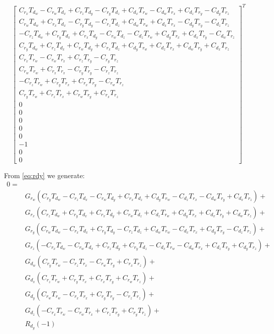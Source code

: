 \documentclass[12pt]{article}
\begin{document}
   \begin{equation}
       \begin{bmatrix}
       C_{r_x} T_{d_w}-C_{r_w} T_{d_x}+C_{r_z} T_{d_y}-C_{r_y} T_{d_z}+C_{d_x} T_{r_w}-C_{d_w} T_{r_x}+C_{d_z} T_{r_y}-C_{d_y} T_{r_z}\\
       C_{r_w} T_{d_w}+C_{r_x} T_{d_x}-C_{r_y} T_{d_y}-C_{r_z} T_{d_z}+C_{d_w} T_{r_w}+C_{d_x} T_{r_x}-C_{d_y} T_{r_y}-C_{d_z} T_{r_z}\\
       -C_{r_z} T_{d_w}+C_{r_y} T_{d_x}+C_{r_x} T_{d_y}-C_{r_w} T_{d_z}-C_{d_z} T_{r_w}+C_{d_y} T_{r_x}+C_{d_x} T_{r_y}-C_{d_w} T_{r_z}\\
       C_{r_y} T_{d_w}+C_{r_z} T_{d_x}+C_{r_w} T_{d_y}+C_{r_x} T_{d_z}+C_{d_y} T_{r_w}+C_{d_z} T_{r_x}+C_{d_w} T_{r_y}+C_{d_x} T_{r_z}\\
       C_{r_x} T_{r_w}-C_{r_w} T_{r_x}+C_{r_z} T_{r_y}-C_{r_y} T_{r_z}\\
       C_{r_w} T_{r_w}+C_{r_x} T_{r_x}-C_{r_y} T_{r_y}-C_{r_z} T_{r_z}\\
       -C_{r_z} T_{r_w}+C_{r_y} T_{r_x}+C_{r_x} T_{r_y}-C_{r_w} T_{r_z}\\
       C_{r_y} T_{r_w}+C_{r_z} T_{r_x}+C_{r_w} T_{r_y}+C_{r_x} T_{r_z}\\
       0 \\ 0 \\ 0 \\ 0 \\ 0 \\ -1 \\ 0 \\ 0
        \end{bmatrix}^T
    \end{equation}
	
	
	From \autoref{eq:rdy} we generate:
	\begin{equation}
	    \begin{split}
	0= \\&
	G_{r_w} (C_{r_y} T_{d_w}-C_{r_z} T_{d_x}-C_{r_w} T_{d_y}+C_{r_x} T_{d_z}+C_{d_y} T_{r_w}-C_{d_z} T_{r_x}-C_{d_w} T_{r_y}+C_{d_x} T_{r_z})+\\&
	G_{r_x} (C_{r_z} T_{d_w}+C_{r_y} T_{d_x}+C_{r_x} T_{d_y}+C_{r_w} T_{d_z}+C_{d_z} T_{r_w}+C_{d_y} T_{r_x}+C_{d_x} T_{r_y}+C_{d_w} T_{r_z})+\\&
	G_{r_y} (C_{r_w} T_{d_w}-C_{r_x} T_{d_x}+C_{r_y} T_{d_y}-C_{r_z} T_{d_z}+C_{d_w} T_{r_w}-C_{d_x} T_{r_x}+C_{d_y} T_{r_y}-C_{d_z} T_{r_z})+\\&
	G_{r_z} (-C_{r_x} T_{d_w}-C_{r_w} T_{d_x}+C_{r_z} T_{d_y}+C_{r_y} T_{d_z}-C_{d_x} T_{r_w}-C_{d_w} T_{r_x}+C_{d_z} T_{r_y}+C_{d_y} T_{r_z})+\\&
	G_{d_w} (C_{r_y} T_{r_w}-C_{r_z} T_{r_x}-C_{r_w} T_{r_y}+C_{r_x} T_{r_z})+\\&
	G_{d_x} (C_{r_z} T_{r_w}+C_{r_y} T_{r_x}+C_{r_x} T_{r_y}+C_{r_w} T_{r_z})+\\&
	G_{d_y} (C_{r_w} T_{r_w}-C_{r_x} T_{r_x}+C_{r_y} T_{r_y}-C_{r_z} T_{r_z})+\\&
	G_{d_z} (-C_{r_x} T_{r_w}-C_{r_w} T_{r_x}+C_{r_z} T_{r_y}+C_{r_y} T_{r_z})+\\&
	 R_{d_y}(-1)
	 \end{split}
	 \end{equation}
	
\end{document}
